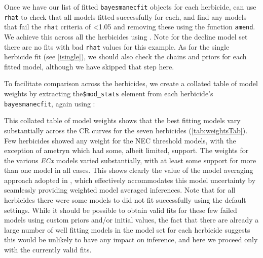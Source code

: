 \documentclass[
  shortnames]{jss}
\begin{document}
Once we have our list of fitted \texttt{bayesmanecfit} objects for each herbicide, can use \texttt{rhat} to check that all models fitted successfully for each, and find any models that fail the \texttt{rhat} criteria of \textless1.05 and removing these using the function \texttt{amend}. We achieve this across all the herbicides using . Note for the decline model set there are no fits with bad \texttt{rhat} values for this example. As for the single herbicide fit (see \ref{isingle}), we should also check the chains and priors for each fitted model, although we have skipped that step here.

\begin{CodeChunk}
\end{CodeChunk}

To facilitate comparison across the herbicides, we create a collated table of model weights by extracting the\texttt{\$mod\_stats} element from each herbicide's \texttt{bayesmanecfit}, again using :

\begin{CodeChunk}
\end{CodeChunk}

This collated table of model weights shows that the best fitting models vary substantially across the CR curves for the seven herbicides (\autoref{tab:weightsTab}). Few herbicides showed any weight for the NEC threshold models, with the exception of ametryn which had some, albeit limited, support. The weights for the various \emph{ECx} models varied substantially, with at least some support for more than one model in all cases. This shows clearly the value of the model averaging approach adopted in , which effectively accommodates this model uncertainty by seamlessly providing weighted model averaged inferences. Note that for all herbicides there were some models to did not fit successfully using the default  settings. While it should be possible to obtain valid fits for these few failed models using custom priors and/or initial values, the fact that there are already a large number of well fitting models in the model set for each herbicide suggests this would be unlikely to have any impact on inference, and here we proceed only with the currently valid fits.
\end{document}
